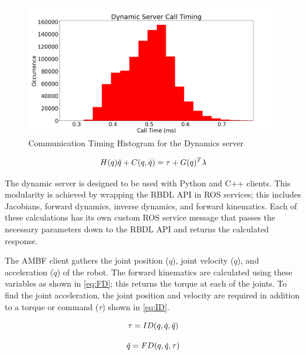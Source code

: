  \begin{figure}
     \centering
     \includegraphics[scale=0.35]{images/software/dyn_loop_timing.png}
     \caption[Dynamic Timing Histogram]{Communication Timing Histogram for the Dynamics server}
     \label{fig:DynCommunicationHistogram}
 \end{figure}
 


\begin{equation}
\Large
    H(q) \Ddot{q} + C(q,\Dot{q}) = \tau + G(q)^T \lambda
    \label{eq:motion}
\end{equation}



The dynamic server is designed to be used with Python and C++ clients. This modularity is achieved by wrapping the RBDL API in ROS services; this includes Jacobians, forward dynamics, inverse dynamics, and forward kinematics. Each of these calculations has its own custom ROS service message that passes the necessary parameters down to the RBDL API and returns the calculated response. 

The AMBF client gathers the joint position ($q$), joint velocity ($\Dot{q}$), and acceleration ($\DDot{q}$) of the robot.  The forward kinematics are calculated using these variables as shown in \autoref{eq:FD}; this returns the torque at each of the joints. To find the joint acceleration, the joint position and velocity are required in addition to a torque or command ($\tau$) shown in \autoref{eq:ID}.  

\begin{equation}
    \Large
    \tau = ID(q,\Dot{q}, \Ddot{q})
    \label{eq:ID}
\end{equation}


\begin{equation}
    \Large
    \Ddot{q} = FD(q,\Dot{q}, \tau )
    \label{eq:FD}
\end{equation}


